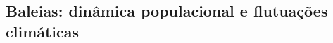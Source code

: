 \subsection{Baleias: dinâmica populacional e flutuações climáticas} %
\label{sec:dinam-popul-de} 


